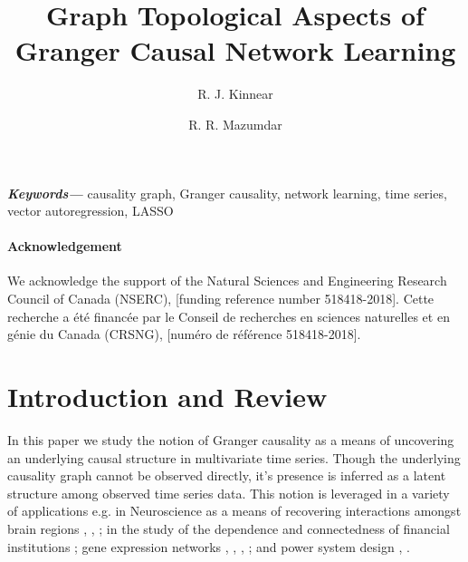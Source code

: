 \documentclass{statsoc}
\title{Graph Topological Aspects of Granger Causal Network Learning}
\author[Author 1 {\it et al.}]{R. J. Kinnear}
\author{R. R. Mazumdar}
\providecommand{\keywords}[1]{\textbf{\textit{Keywords---}} #1}
\begin{document}

\keywords{causality graph, Granger causality, network learning, time
  series, vector autoregression, LASSO}

\paragraph{Acknowledgement}

We acknowledge the support of the Natural Sciences and Engineering Research Council of Canada (NSERC), [funding reference number 518418-2018].  Cette recherche a été financée par le Conseil de recherches en sciences naturelles et en génie du Canada (CRSNG), [numéro de référence 518418-2018].

\section{Introduction and Review}
\label{sec:introduction}
In this paper we study the notion of Granger causality
\cite{granger1969investigating} \cite{Granger1980329} as a means of
uncovering an underlying causal structure in multivariate time series.
Though the underlying causality graph cannot be observed directly,
it's presence is inferred as a latent structure among observed
time series data.  This notion is leveraged in a variety of
applications e.g. in Neuroscience as a means of recovering
interactions amongst brain regions \cite{bressler2011wiener},
\cite{anna_paper2008}, \cite{david2008identifying}; in the study of
the dependence and connectedness of financial institutions
\cite{NBERw16223}; gene expression networks \cite{Fujita2007},
\cite{methods_for_inferring_gene_regulatory_networks_from_time_series_expression_data},
\cite{grouped_graphical_granger_modelling_for_gene_expression_regulatory_networks_discovery},
\cite{discovering_graphical_Granger_causality_using_the_truncating_lasso_penalty};
and power system design \cite{Misyrlis2016450}, \cite{yuan2014root}.
\end{document}
